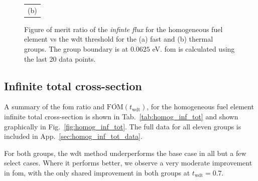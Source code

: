 \begin{figure}[hbtp]
\begin{tabular}{c}
    (b) 
  \end{tabular}
  \caption[Figure of merit ratio of the \textit{infinte flux} for the
  homogeneous fuel element]{Figure of merit ratio of the \textit{infinte flux}
    for the homogeneous fuel element vs the
    \gls{wdt} threshold for the (a) fast and (b) thermal 
    groups. The group boundary is at $0.0625$ eV. \gls{fom} is
    calculated using the last 20 data points.}
  \label{fig:homog_inf_flx}
\end{figure}

\subsection{Infinite total cross-section}
\label{sec:homog_inf_total}

A summary of the \gls{fom} ratio and
$\overline{\mathrm{FOM}}(t_{\mathrm{wdt}})$, for the homogeneous fuel element
 infinite total cross-section is shown in Tab.~\ref{tab:homog_inf_tot} and shown
graphically in Fig.~\ref{fig:homog_inf_tot}. The full data for all
eleven groups is included in App.~\ref{sec:homog_inf_tot_data}.

For both groups, the \gls{wdt} method underperforms the base case in
all but a few select cases. Where it performs better, we observe a very
moderate improvement in \gls{fom}, with the only shared improvement in
both groups at $t_{\mathrm{wdt}} = 0.7$.

